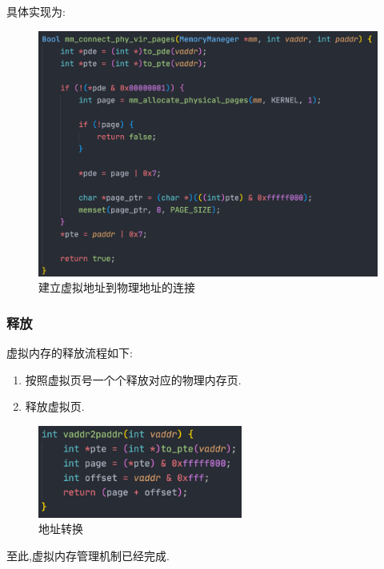 具体实现为:

\begin{figure}[H]
    \centering
    \includegraphics[width=\textwidth]{figures/va0.png}
    \caption{建立虚拟地址到物理地址的连接}
    \label{fig:my_label}
\end{figure}

\subsubsection{释放}
虚拟内存的释放流程如下:
\begin{enumerate}[itemindent=1em]
    \item 按照虚拟页号一个个释放对应的物理内存页.
    \item 释放虚拟页.
\end{enumerate}

\begin{figure}[H]
    \centering
    \includegraphics[width=0.6\textwidth]{figures/va1.png}
    \caption{地址转换}
    \label{fig:my_label}
\end{figure}

至此,虚拟内存管理机制已经完成.
